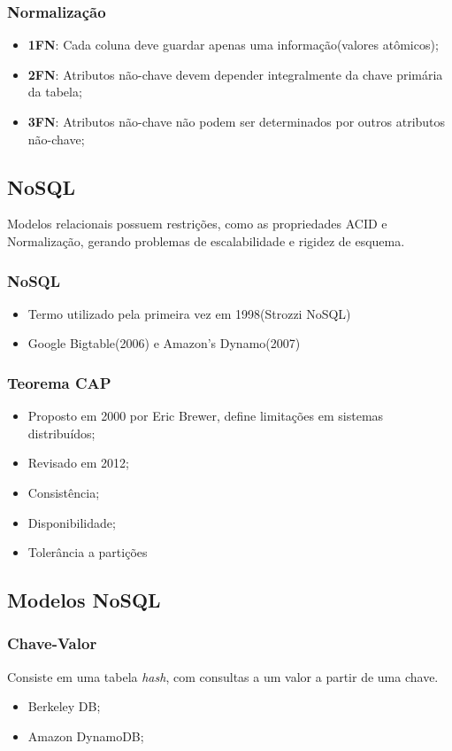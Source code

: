 \documentclass[brazil]{beamer}
\begin{document}
\begin{frame}
\frametitle{Normalização}
	\begin{itemize}
		\item \textbf{1FN}: Cada coluna deve guardar apenas uma informação(valores atômicos);
		\item \textbf{2FN}: Atributos não-chave devem depender integralmente da chave primária da tabela;
		\item \textbf{3FN}: Atributos não-chave não podem ser determinados por outros atributos não-chave; 
	\end{itemize}
\end{frame}

\subsection{NoSQL}
Modelos relacionais possuem restrições, como as propriedades ACID e Normalização, gerando problemas de escalabilidade e rigidez de esquema.
\begin{frame}
\frametitle{NoSQL}
	\begin{itemize}
		\item Termo utilizado pela primeira vez em 1998(Strozzi NoSQL)
		\item Google Bigtable(2006) e Amazon's Dynamo(2007)
	\end{itemize}
\end{frame}


\begin{frame}
	\frametitle{Teorema CAP}
	\begin{itemize}
		\item Proposto em 2000 por Eric Brewer, define limitações em sistemas distribuídos;
		\item Revisado em 2012;
		\item Consistência;
		\item Disponibilidade;
		\item Tolerância a partições
	\end{itemize}
\end{frame}

\subsection{Modelos NoSQL}
\begin{frame}
	\frametitle{Chave-Valor}
		Consiste em uma tabela \emph{hash}, com consultas a um valor a partir de uma chave.
		\begin{itemize}
			\item Berkeley DB;
			\item Amazon DynamoDB;
		\end{itemize}
\end{frame}
\end{document}
